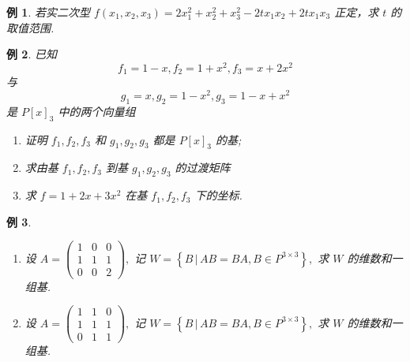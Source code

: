 \documentclass[13pt]{beamer}
\newtheorem{exa}{例}
\begin{document}
\begin{frame}
\begin{exa}
若实二次型 $f\left(x_{1}, x_{2}, x_{3}\right)=2 x_{1}^{2}+x_{2}^{2}+x_{3}^{2}-2 t x_{1} x_{2}+2 t x_{1} x_{3}$ 正定，求 $t$ 的取值范围.
\end{exa}
\end{frame}


\setcounter{exa}{0}
\begin{frame}

\begin{exa}
	已知 $$f_{1}=1-x, f_{2}=1+x^{2}, f_{3}=x+2 x^{2}$$ 与 $$g_{1}=x, g_{2}=1-x^{2}, g_{3}=1-x+x^{2}$$ 是 $P[x]_{3}$ 中的两个向量组
	\begin{enumerate}
		\item 证明 $f_{1}, f_{2}, f_{3}$ 和 $g_{1}, g_{2}, g_{3}$ 都是 $P[x]_{3}$ 的基;
		\item 求由基 $f_{1}, f_{2}, f_{3}$ 到基 $g_{1}, g_{2}, g_{3}$ 的过渡矩阵
		\item 求 $f=1+2 x+3 x^{2}$ 在基 $f_{1}, f_{2}, f_{3}$ 下的坐标.
	\end{enumerate}
\end{exa}
\end{frame}



\begin{frame}
\small{\begin{exa}
	\begin{enumerate}
		\item 设 $A=\left(\begin{array}{ccc}1 & 0 & 0 \\ 1 & 1 & 1 \\ 0 & 0 & 2\end{array}\right),$ 记 $W=\left\{B\, | \, A B=B A, B \in P^{3 \times 3}\right\},$ 求 $W$ 的维数和一组基.
		\item 设 $A=\left(\begin{array}{ccc}1 & 1 & 0 \\ 1 & 1 & 1 \\ 0 & 1 & 1\end{array}\right),$ 记 $W=\left\{B \, |\, A B=B A, B \in P^{3 \times 3}\right\},$ 求 $W$ 的维数和一组基.
	\end{enumerate}
\end{exa}}
\end{frame}
\end{document}

